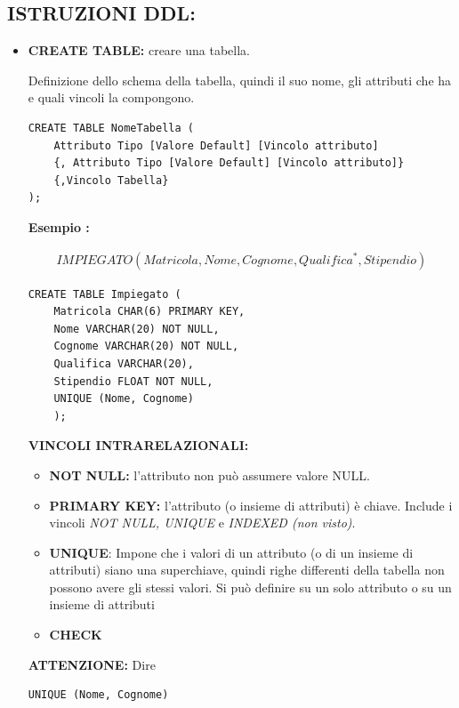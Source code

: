 \documentclass{article}
\newcounter{esempio}
\newenvironment{esempio}{
	\refstepcounter{esempio}%
	\noindent\textbf{Esempio \theesempio:}
}{\par}
\begin{document}
\subsection{ISTRUZIONI DDL:}
\begin{itemize}
    \item \textbf{CREATE TABLE:} creare una tabella.

    Definizione dello schema della tabella, quindi il suo nome, gli attributi che ha e quali vincoli la compongono.

\begin{lstlisting}[style=sqlstyle]
CREATE TABLE NomeTabella (
    Attributo Tipo [Valore Default] [Vincolo attributo]
    {, Attributo Tipo [Valore Default] [Vincolo attributo]}
    {,Vincolo Tabella}
);
\end{lstlisting}

\begin{esempio}
\begin{align*}
	IMPIEGATO(Matricola, Nome, Cognome, Qualifica^*, Stipendio)
\end{align*}

\begin{lstlisting}[style=sqlstyle]
	CREATE TABLE Impiegato (
	Matricola CHAR(6) PRIMARY KEY,
	Nome VARCHAR(20) NOT NULL,
	Cognome VARCHAR(20) NOT NULL,
	Qualifica VARCHAR(20),
	Stipendio FLOAT NOT NULL,
	UNIQUE (Nome, Cognome)
	);
\end{lstlisting}	
\end{esempio}

\textbf{VINCOLI INTRARELAZIONALI:}
\begin{itemize}
    \item \textbf{NOT NULL:} l'attributo non può assumere valore NULL.
    \item \textbf{PRIMARY KEY:} l'attributo (o insieme di attributi) è chiave. Include i vincoli \textit{NOT NULL, UNIQUE} e \textit{INDEXED (non visto)}.
    \item \textbf{UNIQUE}: Impone che i valori di un attributo (o di un insieme di attributi) siano una superchiave, quindi righe differenti della tabella non possono avere gli stessi valori.
    Si può definire su un solo attributo o su un insieme di attributi
    \item \textbf{CHECK}
\end{itemize}

\textbf{ATTENZIONE:}
	Dire 
	
	\begin{lstlisting}[style=sqlstyle]
UNIQUE (Nome, Cognome)
	\end{lstlisting}
	

\end{itemize}
\end{document}
